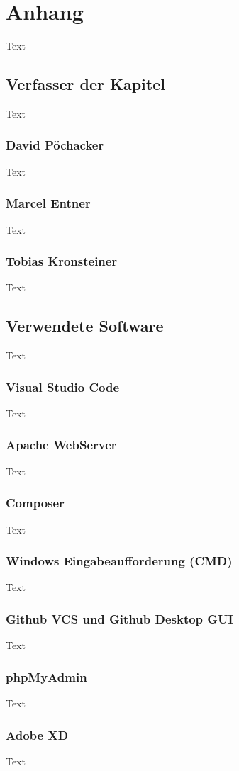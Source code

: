 \chapter{Anhang}
Text

\section{Verfasser der Kapitel}
Text
\subsection{David Pöchacker}
Text
\subsection{Marcel Entner}
Text
\subsection{Tobias Kronsteiner}
Text


\section{Verwendete Software}
Text
\subsection{Visual Studio Code}
Text
\subsection{Apache WebServer}
Text
\subsection{Composer}
Text
\subsection{Windows Eingabeaufforderung (CMD)}
Text
\subsection{Github VCS und Github Desktop GUI}
Text
\subsection{ phpMyAdmin}
Text
\subsection{Adobe XD}
Text
